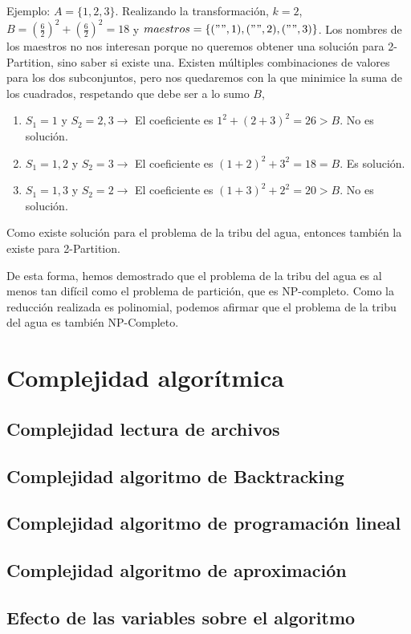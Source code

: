 \documentclass{article}
\begin{document}
Ejemplo: $A = \{1, 2, 3\}$. Realizando la transformación, $k = 2$, $B = (\frac{6}{2})^2 + (\frac{6}{2})^2 = 18$ y $maestros = \{("", 1), ("", 2), ("", 3)\}$. Los nombres de los maestros no nos interesan porque no queremos obtener una solución para 2-Partition, sino saber si existe una. Existen múltiples combinaciones de valores para los dos subconjuntos, pero nos quedaremos con la que minimice la suma de los cuadrados, respetando que debe ser a lo sumo $B$,
\begin{enumerate}
    \item $S_1 = {1}$ y $S_2 = {2, 3} \rightarrow$ El coeficiente es $1^2 + (2 + 3)^2 = 26 > B$. No es solución.
    \item $S_1 = {1, 2}$ y $S_2 = {3} \rightarrow$ El coeficiente es $(1 + 2)^2 + 3^2 = 18 = B$. Es solución.
    \item $S_1 = {1, 3}$ y $S_2 = {2} \rightarrow$ El coeficiente es $(1 + 3)^2 + 2^2 = 20 > B$. No es solución.    
\end{enumerate}
Como existe solución para el problema de la tribu del agua, entonces también la existe para 2-Partition.

De esta forma, hemos demostrado que el problema de la tribu del agua es al menos tan difícil como el problema de partición, que es NP-completo. Como la reducción realizada es polinomial, podemos afirmar que el problema de la tribu del agua es también NP-Completo.

\section{Complejidad algorítmica}
\subsection{Complejidad lectura de archivos}
\subsection{Complejidad algoritmo de Backtracking}
\subsection{Complejidad algoritmo de programación lineal}
\subsection{Complejidad algoritmo de aproximación}

\subsection{Efecto de las variables sobre el algoritmo}
\end{document}
